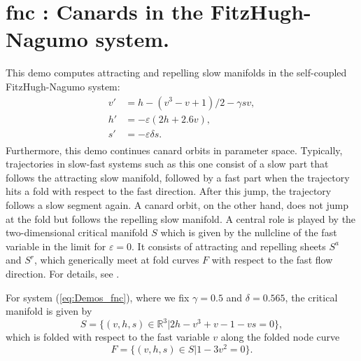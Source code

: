 \documentclass[12pt]{report}
\begin{document}
\newpage
\section{ fnc : Canards in the FitzHugh-Nagumo system.} \label{sec:Demos_fnc}

This demo computes attracting and repelling slow manifolds
in the self-coupled FitzHugh-Nagumo system:
\begin{equation} \label{eq:Demos_fnc} \begin{array}{cl} 
v' &= h - (v^3 - v + 1) / 2 - \gamma s v,\\
h' &= -\varepsilon (2h + 2.6 v),\\
s' &= -\varepsilon \delta s.\\
\end{array} \end{equation}
Furthermore, this demo continues canard orbits in parameter space.
Typically, trajectories in slow-fast systems such as this one
consist of a slow part
that follows the attracting slow manifold, followed by a fast part
when the trajectory hits a fold with respect to the fast direction.
After this jump, the trajectory follows a slow segment again.
A canard orbit, on the other hand, does not jump at the fold but
follows the repelling slow manifold. A central role is played by the
two-dimensional critical manifold $S$ which is given by the nullcline
of the fast variable in the limit for $\varepsilon=0$. It consists of
attracting and repelling sheets $S^a$ and $S^r$, which generically
meet at fold curves $F$ with respect to the fast flow direction.
For details, see  \citeyear{DeKrOs:08,DeKrOs:09}.

For system (\ref{eq:Demos_fnc}), where we fix $\gamma=0.5$ and
$\delta=0.565$, the critical manifold is given by
\begin{equation} \label{eq:Demos_fnc_S}
S=\{(v,h,s)\in \mathbb{R}^3| 2h-v^3+v-1-vs=0\},
\end{equation}
which is folded with respect to the fast variable $v$ along the folded
node curve
\begin{equation} \label{eq:Demos_fnc_F}
F=\{(v,h,s)\in S| 1 - 3v^2=0\}.
\end{equation}
\end{document}
